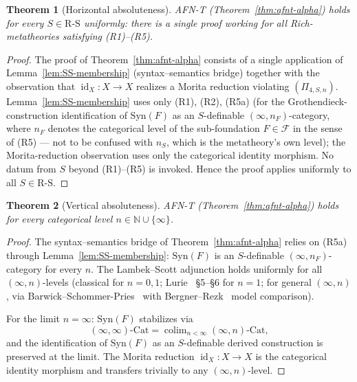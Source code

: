 \documentclass[11pt]{article}
\theoremstyle{plain}
\newtheorem{theorem}{Theorem}[section]
\theoremstyle{definition}
\newcommand{\RS}{\mathrm{R\text{-}S}}
\newcommand{\cF}{\mathcal{F}}
\newcommand{\Cat}{\mathrm{Cat}}
\newcommand{\Syn}{\mathrm{Syn}}
\DeclareMathOperator{\colim}{colim}
\DeclareMathOperator{\id}{id}
\begin{document}
\begin{figure}[ht]
\label{fig:five-axis}
\end{figure}

\begin{theorem}[Horizontal absoluteness]\label{thm:horizontal}
AFN-T (Theorem~\ref{thm:afnt-alpha}) holds for every $S \in \RS$ uniformly: there is a single proof working for all Rich-metatheories satisfying (R1)--(R5).
\end{theorem}

\begin{proof}
The proof of Theorem~\ref{thm:afnt-alpha} consists of a single application of Lemma~\ref{lem:SS-membership} (syntax--semantics bridge) together with the observation that $\id_X : X \to X$ realizes a Morita reduction violating $(\Pi_{4, S, n})$. Lemma~\ref{lem:SS-membership} uses only (R1), (R2), (R5a) (for the Grothendieck-construction identification of $\Syn(F)$ as an $S$-definable $(\infty, n_F)$-category, where $n_F$ denotes the categorical level of the sub-foundation $F \in \cF$ in the sense of (R5) --- not to be confused with $n_S$, which is the metatheory's own level); the Morita-reduction observation uses only the categorical identity morphism. No datum from $S$ beyond (R1)--(R5) is invoked. Hence the proof applies uniformly to all $S \in \RS$.
\end{proof}

\begin{theorem}[Vertical absoluteness]\label{thm:vertical}
AFN-T (Theorem~\ref{thm:afnt-alpha}) holds for every categorical level $n \in \mathbb{N} \cup \{\infty\}$.
\end{theorem}

\begin{proof}
The syntax--semantics bridge of Theorem~\ref{thm:afnt-alpha} relies on (R5a) through Lemma~\ref{lem:SS-membership}: $\Syn(F)$ is an $S$-definable $(\infty, n_F)$-category for every $n$. The Lambek--Scott adjunction holds uniformly for all $(\infty, n)$-levels (classical for $n = 0, 1$; Lurie~\cite{LurieHTT} \S 5--\S 6 for $n = 1$; for general $(\infty, n)$, via Barwick--Schommer-Pries~\cite{BarwickSchommerPries2021} with Bergner--Rezk~\cite{BergnerRezk2013} model comparison).

For the limit $n = \infty$: $\Syn(F)$ stabilizes via
\[ (\infty, \infty)\text{-}\Cat = \colim_{n < \infty} (\infty, n)\text{-}\Cat, \]
and the identification of $\Syn(F)$ as an $S$-definable derived construction is preserved at the limit. The Morita reduction $\id_X : X \to X$ is the categorical identity morphism and transfers trivially to any $(\infty, n)$-level.
\end{proof}
\end{document}

